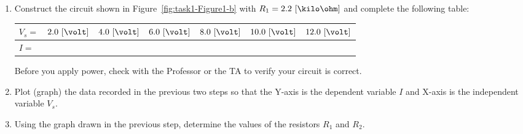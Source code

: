 \begin{enumerate}
\item Construct the circuit shown in Figure~\ref{fig:task1-Figure1-b} with $R_1=2.2~[\kilo\ohm]$ and complete the following table: %
%
  \begin{center}
  \begin{tabular}{|l|l|l|l|l|l|l|}
    \toprule
    $V_s=$ &  $2.0~[\volt]$ & $4.0~[\volt]$ & $6.0~[\volt]$ & $8.0~[\volt]$ &$10.0~[\volt]$ & $12.0~[\volt]$ \\                         %
    \hline                  %
    $I = $   & & & & & &\\  %
    \bottomrule             %
  \end{tabular}      
  \end{center}

    \begin{mdframed}[roundcorner=5pt,backgroundcolor=yellow!50]
    Before you apply power, check with the Professor or the TA to verify your circuit is correct. 
  \end{mdframed}

\item Plot (graph) the data recorded in the previous two steps  so that the Y-axis is the dependent variable  $I$  and X-axis is the independent variable $V_s.$

  
\item Using the graph drawn in the previous step, determine the values of the resistors $R_1$ and $R_2.$

  
\end{enumerate}

